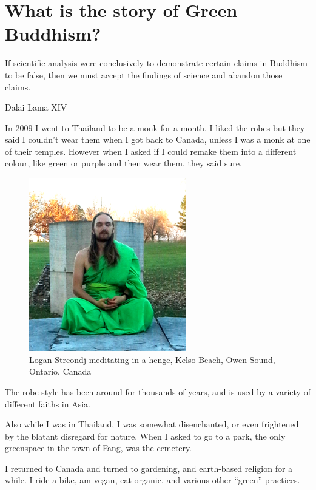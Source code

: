 
\chapter{What is the story of Green Buddhism?}
\epigraph{If scientific analysis were conclusively to demonstrate certain claims
in Buddhism to be false, then we must accept the findings of science and abandon
those claims.}
{Dalai Lama XIV\cite{singleAtom}}
\label{whatstory}
In 2009 I went to Thailand to be a monk for a month. I liked the robes but they
said I couldn't wear them when I got back to Canada, unless I was a monk at one
of their temples. However when I asked if I could remake them into a different 
colour, like green or purple and then wear them, they said sure. 

\begin{figure}
  \centering
  \includegraphics[width=0.61\textwidth]{photograph/logan_streondj_meditating_20151109.png}
  \caption{Logan Streondj meditating in a henge, Kelso Beach, 
          Owen Sound, Ontario, Canada}
\label{fig:meditating}
\end{figure}

The robe style has been around for thousands of years, and is used by a variety
of different faiths in Asia. 

Also while I was in Thailand, I was somewhat disenchanted, or even frightened by
the blatant disregard for nature. When I asked to go to a park, the only
greenspace in the town of Fang, was the cemetery. 

I returned to Canada and turned to gardening, and earth-based religion for a
while. I ride a bike, am vegan, eat organic, and various other ``green''
practices.

